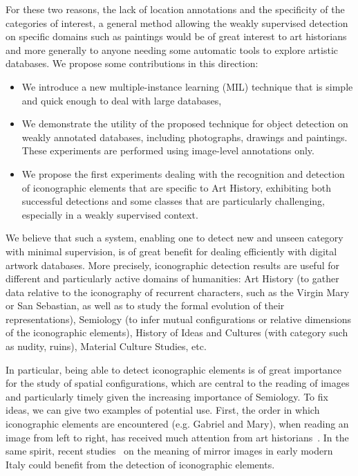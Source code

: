 \documentclass[runningheads]{llncs}
\begin{document}
For these two reasons, the lack of location annotations and the specificity of the categories of interest, a general method allowing the weakly supervised detection on specific domains such as paintings would be of great interest to art historians and more generally to anyone needing some automatic tools to explore artistic databases. We propose some contributions in this direction:
\begin{itemize}
    \item We introduce a new multiple-instance learning (MIL) technique that is simple and quick enough to deal with large databases,
\item We demonstrate the utility of the proposed technique for object detection on weakly annotated databases, including photographs, drawings and paintings. These experiments are performed using image-level annotations only. 
\item We propose the first experiments dealing with the recognition and detection of iconographic elements that are specific to Art History, exhibiting both successful detections and some classes that are particularly challenging, especially in a weakly supervised context.

\end{itemize}

We believe that such a system, enabling one to detect new and unseen category with minimal supervision, is of great benefit for dealing efficiently with digital artwork databases. More precisely, iconographic detection results are useful for different and particularly active domains of humanities: Art History (to gather data relative to the iconography of recurrent characters, such as the Virgin Mary or San Sebastian, as well as to study the formal evolution of their representations), Semiology (to infer mutual configurations or relative dimensions of the iconographic elements), History of Ideas and Cultures (with category such as nudity, ruins), Material Culture Studies, etc. 

In particular, being able to detect iconographic elements is of great importance for the study of spatial configurations, which are central to the reading of images and particularly timely given the increasing importance of Semiology. To fix ideas, we can give two examples of potential use. First, the order in which iconographic elements are encountered (e.g. Gabriel and Mary), when reading an image from left to right, has received much attention from art historians~\cite{gasparro2008dal}. In the same spirit, recent studies~\cite{deBosio2017} on the meaning of mirror images in early modern Italy could benefit from the detection of iconographic elements. 
\end{document}
